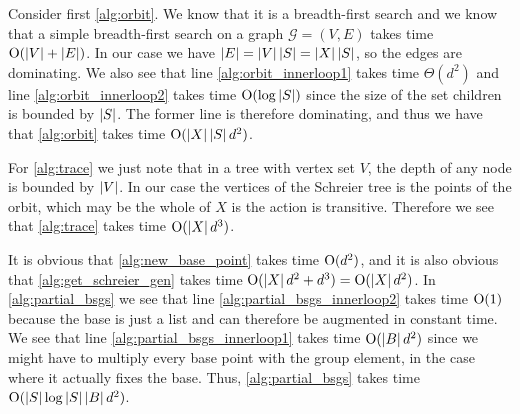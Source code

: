 Consider first \ref{alg:orbit}. We know that it is a breadth-first
search and we know that a simple breadth-first search on a graph
$\mathcal{G} = (V, E)$ takes time $\operatorname{O} ( \left\lvert V \right\rvert + \left\lvert E \right\rvert )$. In our case
we have $\left\lvert E \right\rvert = \left\lvert V \right\rvert \left\lvert S \right\rvert = \left\lvert X \right\rvert \left\lvert S \right\rvert$, so the edges
are dominating. We also see that line \ref{alg:orbit_innerloop1}
takes time $\Theta(d^2)$ and line \ref{alg:orbit_innerloop2} takes
time $\operatorname{O} ( \log{\left\lvert S \right\rvert} )$ since the size of the set
\textsf{children} is bounded by $\left\lvert S \right\rvert$. The former line is therefore dominating, and thus we have that
\ref{alg:orbit} takes time $\operatorname{O} ( \left\lvert X \right\rvert\left\lvert S \right\rvert d^2 )$.

For \ref{alg:trace} we just note that in a tree with vertex set $V$,
the depth of any node is bounded by $\left\lvert V \right\rvert$. In our case the
vertices of the Schreier tree is the points of the orbit, which may be
the whole of $X$ is the action is transitive. Therefore we see that
\ref{alg:trace} takes time $\operatorname{O} ( \left\lvert X \right\rvert d^3 )$.

It is obvious that \ref{alg:new_base_point} takes time $\operatorname{O} ( d^2 )$, and it is also obvious that \ref{alg:get_schreier_gen} takes time $\operatorname{O} ( \left\lvert X \right\rvert d^2 + d^3 ) = \operatorname{O} ( \left\lvert X \right\rvert d^2 )$. In
\ref{alg:partial_bsgs} we see that line
\ref{alg:partial_bsgs_innerloop2} takes time $\operatorname{O} ( 1 )$ because the base
is just a list and can therefore be augmented in constant time. We see
that line \ref{alg:partial_bsgs_innerloop1} takes time $\operatorname{O} ( \left\lvert B \right\rvert
  d^2 )$ since we might have to multiply every base point with the
group element, in the case where it actually fixes the base. Thus,
\ref{alg:partial_bsgs} takes time $\operatorname{O} ( \left\lvert S \right\rvert \log{\left\lvert S \right\rvert} \left\lvert B \right\rvert
  d^2 )$.



